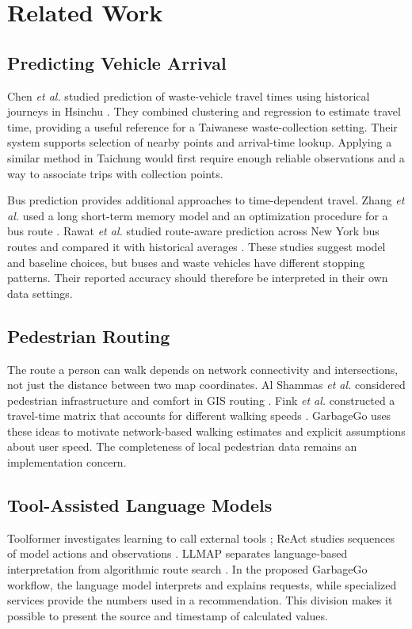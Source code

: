 \section{Related Work}\label{sec:related}
\subsection{Predicting Vehicle Arrival}
Chen \textit{et al.} studied prediction of waste-vehicle travel times using historical journeys in Hsinchu \cite{chen2019travel}. They combined clustering and regression to estimate travel time, providing a useful reference for a Taiwanese waste-collection setting. Their system supports selection of nearby points and arrival-time lookup. Applying a similar method in Taichung would first require enough reliable observations and a way to associate trips with collection points.

Bus prediction provides additional approaches to time-dependent travel. Zhang \textit{et al.} used a long short-term memory model and an optimization procedure for a bus route \cite{zhang2024bus}. Rawat \textit{et al.} studied route-aware prediction across New York bus routes and compared it with historical averages \cite{rawat2026bus}. These studies suggest model and baseline choices, but buses and waste vehicles have different stopping patterns. Their reported accuracy should therefore be interpreted in their own data settings.

\subsection{Pedestrian Routing}
The route a person can walk depends on network connectivity and intersections, not just the distance between two map coordinates. Al Shammas \textit{et al.} considered pedestrian infrastructure and comfort in GIS routing \cite{alshammas2023gis}. Fink \textit{et al.} constructed a travel-time matrix that accounts for different walking speeds \cite{fink2024travel}. GarbageGo uses these ideas to motivate network-based walking estimates and explicit assumptions about user speed. The completeness of local pedestrian data remains an implementation concern.

\subsection{Tool-Assisted Language Models}
Toolformer investigates learning to call external tools \cite{schick2023toolformer}; ReAct studies sequences of model actions and observations \cite{yao2023react}. LLMAP separates language-based interpretation from algorithmic route search \cite{yuan2025llmap}. In the proposed GarbageGo workflow, the language model interprets and explains requests, while specialized services provide the numbers used in a recommendation. This division makes it possible to present the source and timestamp of calculated values.

